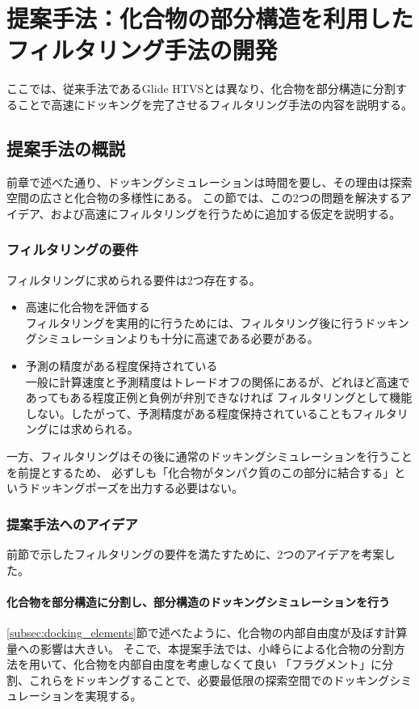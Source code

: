 \chapter{提案手法：化合物の部分構造を利用したフィルタリング手法の開発}
ここでは、従来手法であるGlide HTVSとは異なり、化合物を部分構造に分割することで高速にドッキングを完了させるフィルタリング手法の内容を説明する。

\section{提案手法の概説}
前章で述べた通り、ドッキングシミュレーションは時間を要し、その理由は探索空間の広さと化合物の多様性にある。
この節では、この2つの問題を解決するアイデア、および高速にフィルタリングを行うために追加する仮定を説明する。

\subsection{フィルタリングの要件}\label{subsec}
フィルタリングに求められる要件は2つ存在する。
\begin{itemize}
\item 高速に化合物を評価する\\
	フィルタリングを実用的に行うためには、フィルタリング後に行うドッキングシミュレーションよりも十分に高速である必要がある。
\item 予測の精度がある程度保持されている\\
	一般に計算速度と予測精度はトレードオフの関係にあるが、どれほど高速であってもある程度正例と負例が弁別できなければ
	フィルタリングとして機能しない。したがって、予測精度がある程度保持されていることもフィルタリングには求められる。
\end{itemize}
一方、フィルタリングはその後に通常のドッキングシミュレーションを行うことを前提とするため、
必ずしも「化合物がタンパク質のこの部分に結合する」というドッキングポーズを出力する必要はない。

\subsection{提案手法へのアイデア}\label{subsec:idea}
前節で示したフィルタリングの要件を満たすために、2つのアイデアを考案した。

\subsubsection{化合物を部分構造に分割し、部分構造のドッキングシミュレーションを行う}
\ref{subsec:docking_elements}節で述べたように、化合物の内部自由度が及ぼす計算量への影響は大きい。
そこで、本提案手法では、小峰ら\citetodo{}による化合物の分割方法を用いて、化合物を内部自由度を考慮しなくて良い
「フラグメント」に分割、これらをドッキングすることで、必要最低限の探索空間でのドッキングシミュレーションを実現する。

